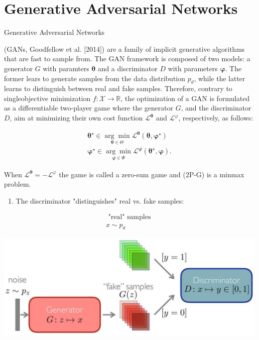 \documentclass[10pt]{article}
\begin{document}
\section*{Generative Adversarial Networks}
Generative Adversarial Networks

(GANs, Goodfellow et al. [2014]) are a family of implicit generative algorithms that are fast to sample from. The GAN framework is composed of two models: a generator $G$ with paramters $\boldsymbol{\theta}$ and a discriminator $D$ with parameters $\boldsymbol{\varphi}$. The former lears to generate samples from the data distribution $p_{d}$, while the latter learns to distinguish between real and fake samples. Therefore, contrary to singleobjective minimization $f: \mathcal{X} \rightarrow \mathbb{R}$, the optimization of a GAN is formulated as a differentiable two-player game where the generator $G$, and the discriminator $D$, aim at minimizing their own cost function $\mathcal{L}^{\boldsymbol{\theta}}$ and $\mathcal{L}^{\varphi}$, respectively, as follows:

$$
\begin{gathered}
\boldsymbol{\theta}^{\star} \in \underset{\boldsymbol{\theta} \in \Theta}{\arg \min } \mathcal{L}^{\boldsymbol{\theta}}\left(\boldsymbol{\theta}, \boldsymbol{\varphi}^{\star}\right) \\
\boldsymbol{\varphi}^{\star} \in \underset{\boldsymbol{\varphi} \in \Phi}{\arg \min } \mathcal{L}^{\boldsymbol{\varphi}}\left(\boldsymbol{\theta}^{\star}, \boldsymbol{\varphi}\right) .
\end{gathered}
$$

When $\mathcal{L}^{\boldsymbol{\theta}}=-\mathcal{L}^{\varphi}$ the game is called a zero-sum game and (2P-G) is a minmax problem.

\begin{enumerate}
  \item The discriminator "distinguishes" real vs. fake samples:
\end{enumerate}

$$
\begin{gathered}
\text { "real" samples } \\
x \sim p_{d}
\end{gathered}
$$

\begin{center}
\includegraphics[max width=\textwidth]{2024_01_08_a381fc3992661ee7020eg-05(1)}
\end{center}
\end{document}

